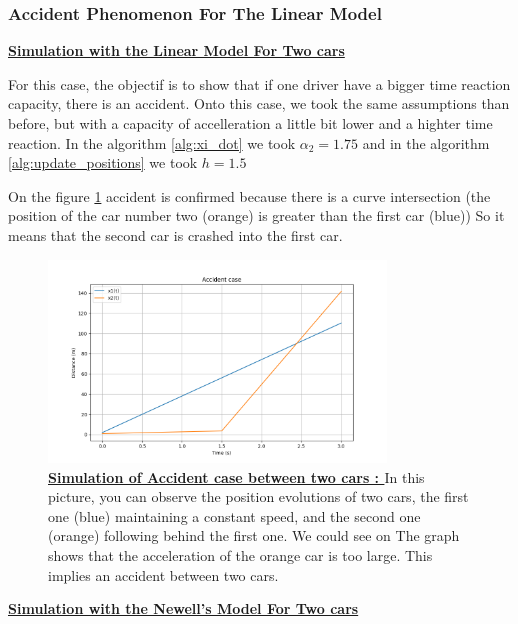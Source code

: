 \documentclass{article}
\begin{document}
		\subsubsection{Accident Phenomenon For The Linear Model }
		
		\textbf{\underline{Simulation with the Linear Model For Two cars}} \newline\newline
		
		For this case, the objectif is to show that if one driver have a bigger time reaction capacity, there is an accident.
		Onto this case, we took the same assumptions than before, but with a capacity of accelleration a little bit lower and a highter time reaction. In the algorithm \ref{alg:xi_dot} we took $\alpha_2=1.75$ and in the algorithm \ref{alg:update_positions} we took $h=1.5$
		
		On the figure \ref{fig:Acc1} accident is confirmed because there is a curve intersection (the position of the car number two (orange) is greater than the first car (blue)) So it means that the second car is crashed into the first car.
		
		\begin{figure}[H]
			\centering
			\includegraphics[width=0.8\textwidth]{Acc1.png}
			\caption[Simulation of Accident case between two cars]{\textbf{\underline{Simulation of Accident case between two cars : }} In this picture, you can observe the position evolutions of two cars, the first one (blue) maintaining a constant speed, and the second one (orange) following behind the first one. We could see on The graph shows that the acceleration of the orange car is too large. This implies an accident between two cars.}
			\label{fig:Acc1}
		\end{figure}
		
		\textbf{\underline{Simulation with the Newell's Model For Two cars}} \newline\newline
		
\end{document}
